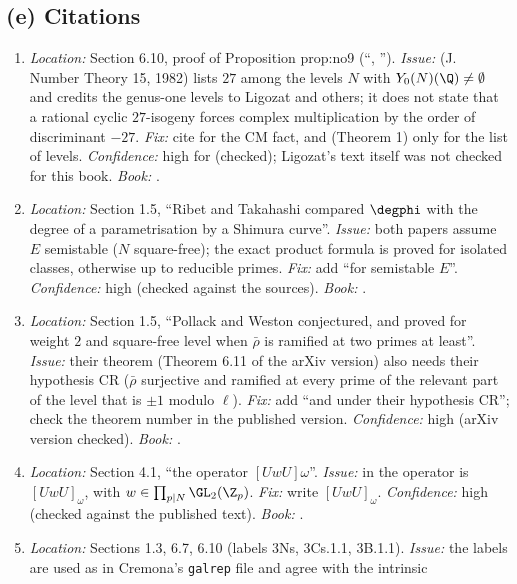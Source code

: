 \begin{sloppypar}
\subsection*{(e) Citations}
\begin{enumerate}[resume*=errata]
\item\label{err:paper:kenku} \emph{Location:} Section 6.10, proof of Proposition prop:no9 (``\cite{Ligozat75}, \cite{Kenku}''). \emph{Issue:} \cite{Kenku} (J. Number Theory 15, 1982) lists $27$ among the levels $N$ with
$Y_0(N)(\Q)\ne\emptyset$ and credits the genus-one levels to Ligozat and others; it does not state that a rational cyclic $27$-isogeny forces complex multiplication by the order of discriminant $-27$.
\emph{Fix:} cite \cite{Ligozat75} for the CM fact, and \cite{Kenku} (Theorem 1) only for the list of levels. \emph{Confidence:} high for \cite{Kenku} (checked); Ligozat's text itself was not checked for this
book. \emph{Book:} .
\item\label{err:paper:rt} \emph{Location:} Section 1.5, ``Ribet and Takahashi \cite{RibetTakahashi97,Takahashi01} compared $\degphi$ with the degree of a parametrisation by a Shimura curve''. \emph{Issue:} both papers
assume $E$ semistable ($N$ square-free); the exact product formula is proved for isolated classes, otherwise up to reducible primes. \emph{Fix:} add ``for semistable $E$''. \emph{Confidence:} high (checked
against the sources). \emph{Book:} .
\item\label{err:paper:pw} \emph{Location:} Section 1.5, ``Pollack and Weston \cite{PollackWeston11} conjectured, and proved for weight $2$ and square-free level when $\bar\rho$ is ramified at two primes at least''.
\emph{Issue:} their theorem (Theorem 6.11 of the arXiv version) also needs their hypothesis CR ($\bar\rho$ surjective and ramified at every prime of the relevant part of the level that is $\pm1$ modulo $\ell$).
\emph{Fix:} add ``and under their hypothesis CR''; check the theorem number in the published version. \emph{Confidence:} high (arXiv version checked). \emph{Book:} .
\item\label{err:paper:dfg-wording} \emph{Location:} Section 4.1, ``the operator $[UwU]\omega$''. \emph{Issue:} in \cite{DFG04} the operator is $[UwU]_\omega$, with $w\in\prod_{p\mid N}\GL_2(\Z_p)$. \emph{Fix:} write $[UwU]_\omega$.
\emph{Confidence:} high (checked against the published text). \emph{Book:} .
\item\label{err:paper:labels} \emph{Location:} Sections 1.3, 6.7, 6.10 (labels 3Ns, 3Cs.1.1, 3B.1.1). \emph{Issue:} the labels are used as in Cremona's \texttt{galrep} file and agree with the intrinsic

\end{enumerate}
\end{sloppypar}
